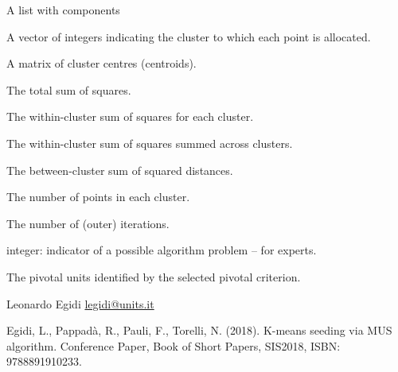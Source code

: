\documentclass[a4paper]{book}
\begin{document}
%
\begin{Value}
A list with components

\begin{ldescription}
\item[\code{\code{cluster}}] A vector of integers indicating the cluster to which each point is allocated.
\item[\code{\code{centers}}] A matrix of cluster centres (centroids).
\item[\code{\code{totss}}] The total sum of squares.
\item[\code{\code{withinss}}] The within-cluster sum of squares for each cluster.
\item[\code{\code{tot.withinss}}] The within-cluster sum of squares summed across clusters.
\item[\code{\code{betwennss}}] The between-cluster sum of squared distances.
\item[\code{\code{size}}]  The number of points in each cluster.
\item[\code{\code{iter}}] The number of (outer) iterations.
\item[\code{\code{ifault}}] integer: indicator of a possible algorithm problem – for experts.
\item[\code{\code{pivots}}] The pivotal units identified by the selected pivotal criterion.
\end{ldescription}
\end{Value}
%
\begin{Author}\relax
Leonardo Egidi \url{legidi@units.it}
\end{Author}
%
\begin{References}\relax
Egidi, L., Pappadà, R., Pauli, F., Torelli, N. (2018).
K-means seeding via MUS algorithm. Conference Paper,
Book of Short Papers, SIS2018, ISBN: 9788891910233.
\end{References}
%
\end{document}
